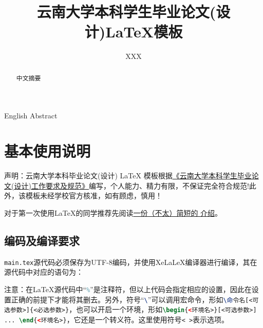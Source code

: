 \documentclass{YNUbachelor}
\title{云南大学本科学生毕业论文(设计)\;\LaTeX 模板}
\author{XXX}
\begin{document}
	
	\cover
	
	\copyrightpage
	
	\maketitle

	\toc

	\begin{abstract}
		中文摘要
	\end{abstract}


	\begin{enabstract}
		English Abstract
	\end{enabstract}

		
	\section{基本使用说明}
		声明：云南大学本科毕业论文(设计) LaTeX 模板根据\href{http://www.jwc.ynu.edu.cn/info/1003/2052.htm}{《云南大学本科学生毕业论文(设计)工作要求及规范》}编写，个人能力、精力有限，不保证完全符合规范!此外，该模板未经学校官方核准，如有顾虑，慎用！
		
		对于第一次使用\LaTeX 的同学推荐先阅读\href{http://mirrors.ctan.org/info/lshort/chinese/lshort-zh-cn.pdf}{一份（不太）简短的 \LaTeXe 介绍}。
		
		\subsection{编码及编译要求}
		\lstinline[language=latex]|main.tex|源代码必须保存为UTF-8编码，并使用XeLaLeX编译器进行编译，其在源代码中对应的语句为：
		
	\begin{latexcode}
	\end{latexcode}
		
		注意：在\LaTeX 源代码中``\lstinline[language=latex]|%|''是注释符，但以上代码会指定相应的设置，因此在设置正确的前提下才能将其删去。另外，符号``\lstinline[language=latex]|\|''可以调用宏命令，形如\lstinline[language=latex]|\命令名[<可选参数>]{<必选参数>}|，也可以开启一个环境，形如\lstinline[language=latex]|\begin{<环境名>}[<可选参数>] ... \end{<环境名>}|，它还是一个转义符。这里使用符号\lstinline[language=latex]|< >|表示选项。
		
\end{document}

